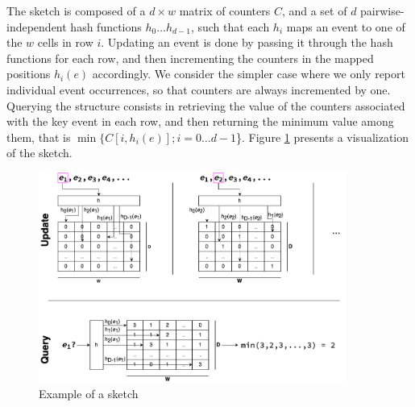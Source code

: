 The sketch is composed of a $d\times w$ matrix of counters $C$, and a set of $d$ pairwise-independent hash functions $h_0\ldots h_{d-1}$, such that each $h_i$ maps an event to one of the $w$ cells in row $i$.
Updating an event is done by passing it through the hash functions for each row, and then incrementing the counters in
the mapped positions $h_i(e)$ accordingly. 
We consider the simpler case where we only report individual event occurrences, so that counters are always incremented by one.
Querying the structure consists in retrieving the value of the counters associated with the key event in each row,  and then returning
the minimum value among them, that is $\min\{C[i,h_i(e)]; i=0\ldots d-1$\}.
Figure \ref{fig:countminexample} presents a visualization of the \cm sketch.

\begin{figure}[htbp]
	\begin{center}
    \includegraphics[width=0.9\textwidth]{figures/cm-example}
	\end{center}
	\caption{Example of a \cm sketch}\label{fig:countminexample}
\end{figure}

